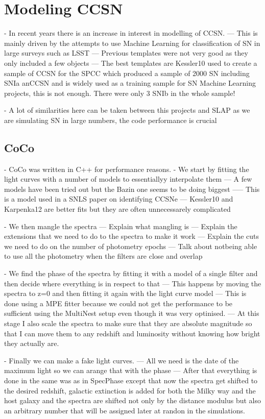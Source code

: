 \section{Modeling CCSN}
- In recent years there is an increase in interest in modelling of CCSN.
--- This is mainly driven by the attempts to use Machine Learning for classification of SN in large surveys such as LSST
--- Previous templates were not very good as they only included a few objects
--- The best templates are Kessler10 used to create a sample of CCSN for the SPCC which produced a sample of 2000 SN including SNIa anCCSN and is widely used as a training sample for SN Machine Learning projects, this is not enough. There were only 3 SNIb in the whole sample!

- A lot of similarities here can be taken between this projects and SLAP as we are simulating SN in large numbers, the code performance is crucial

\subsection{CoCo}
- CoCo was written in C++ for performance reasons.
- We start by fitting the light curves with a number of models to essentiallyy interpolate them
--- A few models have been tried out but the Bazin one seems to be doing biggest
----- This is a model used in a SNLS paper on identifying CCSNe
--- Kessler10 and Karpenka12 are better fits but they are often unnecessarely complicated

- We then mangle the spectra
--- Explain what mangling is
--- Explain the extensions that we need to do to the spectra to make it work
--- Explain the cuts we need to do on the number of photometry epochs
--- Talk about notbeing able to use all the photometry when the filters are close and overlap

- We find the phase of the spectra by fitting it with a model of a single filter and then decide where everything is in respect to that
--- This happens by moving the spectra to z=0 and then fitting it again with the light curve model
--- This is done using a MPE fitter because we could not get the performance to be sufficient using the MultiNest setup even though it was very optinised.
--- At this stage I also scale the spectra to make sure that they are absolute magnitude so that I can move them to any redshift and luminosity without knowing how bright they actually are.

- Finally we can make a fake light curves.
--- All we need is the date of the maximum light so we can arange that with the phase
--- After that everything is done in the same was as in SpecPhase except that now the spectra get shifted to the desired redshift, galactic extinction is added for both the Milky way and the host galaxy and the spectra are shifted not only by the distance modulus but also an arbitrary number that will be assigned later at randon in the simulations.

